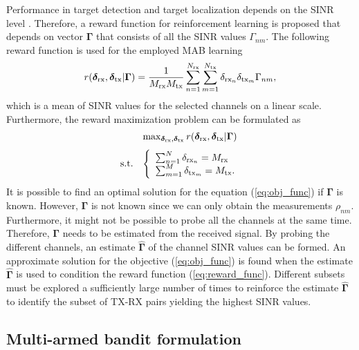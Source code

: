 \documentclass[english, 12pt, a4paper, elec, utf8, a-1b, online]{aaltothesis}
\newcommand{\esinrexp}{\Gamma_{nm}}
\newcommand{\vsinrexp}{\boldsymbol{\Gamma}}
\newcommand{\vsinrb}{\widehat{\boldsymbol{\Gamma}}}
\newcommand{\easvtx}{\delta_{\text{tx}_m}}
\newcommand{\vasvtx}{\boldsymbol{\delta}_{\text{tx}}}
\newcommand{\easvrx}{\delta_{\text{rx}_n}}
\newcommand{\vasvrx}{\boldsymbol{\delta}_{\text{rx}}}
\newcommand{\esp}{\rho_{nm}}
\begin{document}
Performance in target detection and target localization depends on the SINR level \cite{Aittomäki2011, Godrich2011, Sun2014}.
Therefore, a reward function for reinforcement learning is proposed that depends on vector $\vsinrexp$ that consists of all the SINR values $\esinrexp$.
The following reward function is used for the employed MAB learning
\begin{equation}\label{eq:reward_func}
    r(\vasvrx, \vasvtx | \vsinrexp) = \frac{1}{\srx \stx}\sum_{n=1}^\nrx \sum_{m=1}^\ntx  \easvrx \easvtx \esinrexp,
\end{equation}
which is a mean of SINR values for the selected channels on a linear scale.
Furthermore, the reward maximization problem can be formulated as
\begin{equation}\label{eq:obj_func}
    \begin{array}{ll}
                &   \max_{\vasvrx, \vasvtx} r(\vasvrx, \vasvtx | \vsinrexp) \\[7pt]
    \text{s.t.} &   
                \left\{\begin{array}{l}
                    \sum_{n=1}^N \easvrx = \srx \\
                    \sum_{m=1}^M \easvtx = \stx.
                \end{array}\right.
    \end{array}
\end{equation}
It is possible to find an optimal solution for the equation (\ref{eq:obj_func}) if $\vsinrexp$ is known.
However, $\vsinrexp$ is not known since we can only obtain the measurements $\esp$. 
Furthermore, it might not be possible to probe all the channels at the same time.
Therefore, $\vsinrexp$ needs to be estimated from the received signal. 
By probing the different channels, an estimate $\vsinrb$ of the channel SINR values can be formed.
An approximate solution for the objective (\ref{eq:obj_func}) is found when the estimate $\vsinrb$ is used to condition the reward function (\ref{eq:reward_func}).
Different subsets must be explored a sufficiently large number of times to reinforce the estimate $\vsinrb$ to identify the subset of TX-RX pairs yielding the highest SINR values.


\subsection{Multi-armed bandit formulation}
\end{document}
